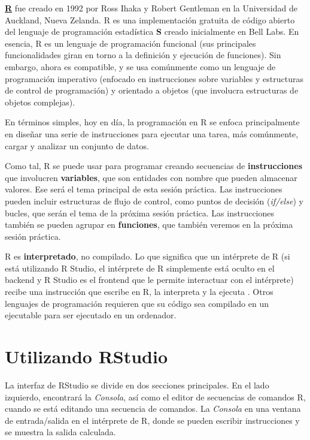 \documentclass[
]{book}
\begin{document}
\textbf{\href{https://www.r-project.org/}{R}} fue creado en 1992 por Ross Ihaka y Robert Gentleman en la Universidad de Auckland, Nueva Zelanda. R es una implementación gratuita de código abierto del lenguaje de programación estadística \textbf{S} creado inicialmente en Bell Labs. En esencia, R es un lenguaje de programación funcional (sus principales funcionalidades giran en torno a la definición y ejecución de funciones). Sin embargo, ahora es compatible, y se usa comúnmente como un lenguaje de programación imperativo (enfocado en instrucciones sobre variables y estructuras de control de programación) y orientado a objetos (que involucra estructuras de objetos complejas).

En términos simples, hoy en día, la programación en R se enfoca principalmente en diseñar una serie de instrucciones para ejecutar una tarea, más comúnmente, cargar y analizar un conjunto de datos.

Como tal, R se puede usar para programar creando secuencias de \textbf{instrucciones} que involucren \textbf{variables}, que son entidades con nombre que pueden almacenar valores. Ese será el tema principal de esta sesión práctica. Las instrucciones pueden incluir estructuras de flujo de control, como puntos de decisión (\emph{if/else}) y bucles, que serán el tema de la próxima sesión práctica. Las instrucciones también se pueden agrupar en \textbf{funciones}, que también veremos en la próxima sesión práctica.

R es \textbf{interpretado}, no compilado. Lo que significa que un intérprete de R (si está utilizando R Studio, el intérprete de R simplemente está oculto en el backend y R Studio es el frontend que le permite interactuar con el intérprete) recibe una instrucción que escribe en R, la interpreta y la ejecuta . Otros lenguajes de programación requieren que su código sea compilado en un ejecutable para ser ejecutado en un ordenador.

\hypertarget{utilizando-rstudio}{%
\section{Utilizando RStudio}\label{utilizando-rstudio}}

La interfaz de RStudio se divide en dos secciones principales. En el lado izquierdo, encontrará la \emph{Consola}, así como el editor de secuencias de comandos R, cuando se está editando una secuencia de comandos. La \emph{Consola} en una ventana de entrada/salida en el intérprete de R, donde se pueden escribir instrucciones y se muestra la salida calculada.
\end{document}
